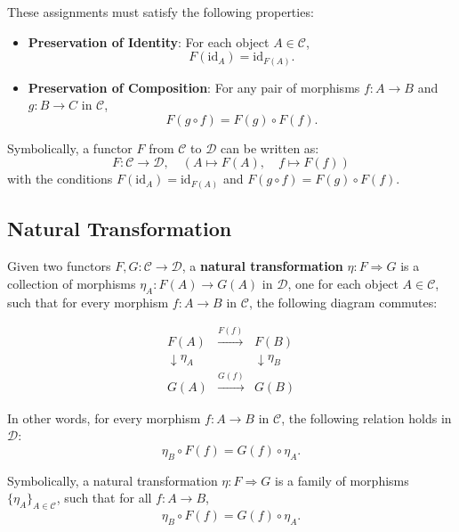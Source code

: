 These assignments must satisfy the following properties:

\begin{itemize}
	\item \textbf{Preservation of Identity}: For each object \( A \in \mathcal{C} \),
	\[
	F(\text{id}_A) = \text{id}_{F(A)}.
	\]
	\item \textbf{Preservation of Composition}: For any pair of morphisms \( f: A \to B \) and \( g: B \to C \) in \( \mathcal{C} \),
	\[
	F(g \circ f) = F(g) \circ F(f).
	\]
\end{itemize}

Symbolically, a functor \( F \) from \( \mathcal{C} \) to \( \mathcal{D} \) can be written as:
\[
F: \mathcal{C} \to \mathcal{D}, \quad \left( A \mapsto F(A), \quad f \mapsto F(f) \right)
\]
with the conditions \( F(\text{id}_A) = \text{id}_{F(A)} \) and \( F(g \circ f) = F(g) \circ F(f) \).


\subsection*{Natural Transformation}
Given two functors \( F, G: \mathcal{C} \to \mathcal{D} \), a \textbf{natural transformation} \( \eta: F \Rightarrow G \) is a collection of morphisms \( \eta_A: F(A) \to G(A) \) in \( \mathcal{D} \), one for each object \( A \in \mathcal{C} \), such that for every morphism \( f: A \to B \) in \( \mathcal{C} \), the following diagram commutes:

\[
\begin{array}{ccc}
	F(A) & \xrightarrow{F(f)} & F(B) \\
	\downarrow{\eta_A} &  & \downarrow{\eta_B} \\
	G(A) & \xrightarrow{G(f)} & G(B)
\end{array}
\]

In other words, for every morphism \( f: A \to B \) in \( \mathcal{C} \), the following relation holds in \( \mathcal{D} \):
\[
\eta_B \circ F(f) = G(f) \circ \eta_A.
\]

Symbolically, a natural transformation \( \eta: F \Rightarrow G \) is a family of morphisms \( \{ \eta_A \}_{A \in \mathcal{C}} \), such that for all \( f: A \to B \),
\[
\eta_B \circ F(f) = G(f) \circ \eta_A.
\]


